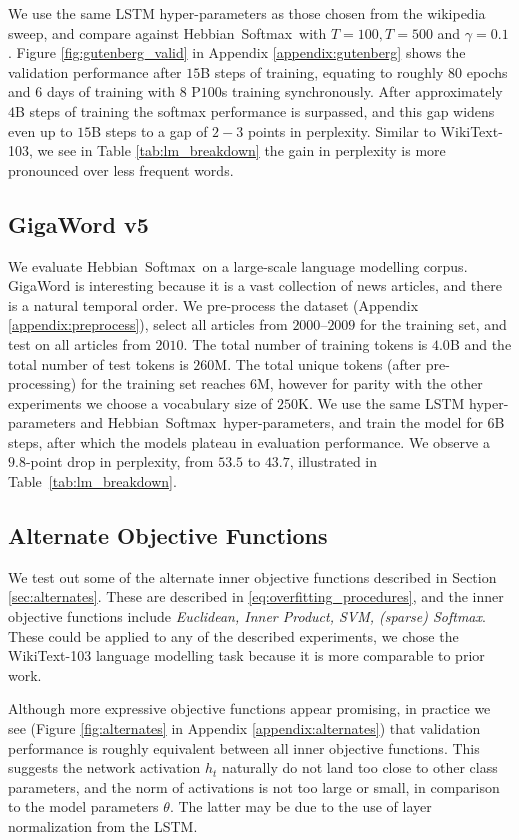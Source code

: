 \documentclass{article} \usepackage{hyperref}
\newcommand{\model}{\hbox{Hebbian Softmax }}
\begin{document}
We use the same LSTM hyper-parameters as those chosen from the wikipedia sweep, and compare against \model with $T=100, T=500$ and $\gamma = 0.1$. Figure \ref{fig:gutenberg_valid} in Appendix \ref{appendix:gutenberg} shows the validation performance after $15$B steps of training, equating to roughly $80$ epochs and $6$ days of training with $8$ P$100$s training synchronously. After approximately $4$B steps of training the softmax performance is surpassed, and this gap widens even up to $15$B steps to a gap of $2-3$ points in perplexity. Similar to WikiText-103, we see in Table \ref{tab:lm_breakdown} the gain in perplexity is more pronounced over less frequent words.


\subsection{GigaWord v5}
We evaluate \model on a large-scale language modelling corpus. GigaWord is interesting because it is a vast collection of news articles, and there is a natural temporal order. We pre-process the dataset (Appendix \ref{appendix:preprocess}), select all articles from $2000$--$2009$ for the training set, and test on all articles from $2010$. The total number of training tokens is $4.0$B and the total number of test tokens is $260$M. The total unique tokens (after pre-processing) for the training set reaches $6$M, however for parity with the other experiments we choose a vocabulary size of $250$K. We use the same LSTM hyper-parameters and \model hyper-parameters, and train the model for $6$B steps, after which the models plateau in evaluation performance. We observe a $9.8$-point drop in perplexity, from $53.5$ to $43.7$, illustrated in Table~\ref{tab:lm_breakdown}. 

\subsection{Alternate Objective Functions}
We test out some of the alternate inner objective functions described in Section \ref{sec:alternates}. These are described in \eqref{eq:overfitting_procedures}, and  the inner objective functions include \textit{Euclidean, Inner Product, SVM, (sparse) Softmax}. These could be applied to any of the described experiments, we chose the WikiText-103 language modelling task because it is more comparable to prior work.

Although more expressive objective functions appear promising, in practice we see (Figure \ref{fig:alternates} in Appendix \ref{appendix:alternates}) that validation performance is roughly equivalent between all inner objective functions. This suggests the network activation $h_t$ naturally do not land too close to other class parameters, and the norm of activations is not too large or small, in comparison to the model parameters $\theta$. The latter may be due to the use of layer normalization from the LSTM.
\end{document}
